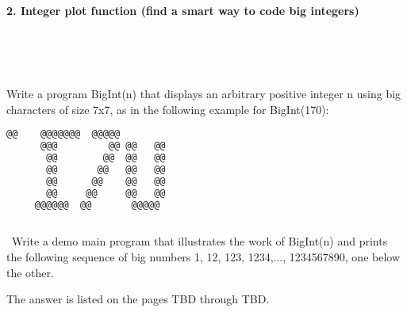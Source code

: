 \documentclass{article}
\begin{document}
	

\paragraph{}\
	
	
	\rmfamily
	
	\paragraph{2. Integer plot function (find a smart way to code big integers) }\
	
	\rmfamily\
	
		Write a program BigInt(n) that displays an arbitrary positive integer n using big characters of size 7x7, as in the following example for BigInt(170):
				
	\ttfamily
	\begin{lstlisting}[language=bash]		
	   @@ 	 @@@@@@@  @@@@@  
	  @@@  	      @@ @@   @@ 
	   @@  	     @@  @@   @@ 
	   @@  	    @@   @@   @@ 
	   @@  	   @@    @@   @@ 
	   @@  	  @@     @@   @@ 
	 @@@@@@	 @@       @@@@@  
		 
	\end{lstlisting}
	
	\rmfamily\
	Write a demo main program that illustrates the work of BigInt(n) and prints the following sequence of big numbers 1, 12, 123, 1234,..., 1234567890, one below the other.
	\newline
	
	The answer is listed on the pages TBD through TBD.
	
	
\paragraph{}\
\paragraph{}\
\paragraph{}\
\paragraph{}\
\paragraph{}\
\paragraph{}\
\end{document}

